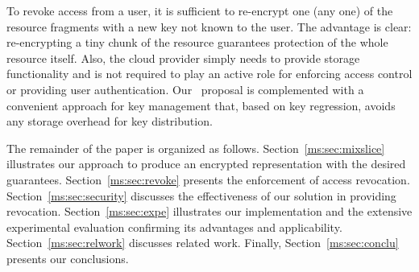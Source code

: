 To revoke access from a user, it is sufficient to re-encrypt one (any one) of the resource fragments with a new key not known to the user. The advantage is clear: re-encrypting a tiny chunk of the resource guarantees protection of the whole resource itself. Also, the cloud provider simply needs to provide storage functionality and is not required to play an active role for enforcing access control or providing user authentication. Our \name\ proposal is complemented with a convenient approach for key management that, based on key regression, avoids any storage overhead for key distribution.

\medskip
{}
The remainder of the paper is organized as follows. Section~\ref{ms:sec:mixslice} illustrates our approach to produce an encrypted representation with the desired guarantees. Section~\ref{ms:sec:revoke} presents the enforcement of access revocation. Section~\ref{ms:sec:security} discusses the effectiveness of our solution in providing revocation. Section~\ref{ms:sec:expe} illustrates our implementation and the extensive experimental evaluation confirming its advantages and applicability. Section~\ref{ms:sec:relwork} discusses related work. Finally, Section~\ref{ms:sec:conclu} presents our conclusions.
